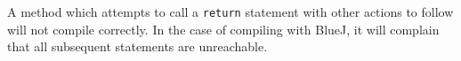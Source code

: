 A method which attempts to call a \verb|return| statement with other
actions to follow will not compile correctly. In the case of compiling
with BlueJ, it will complain that all subsequent statements are
unreachable.
